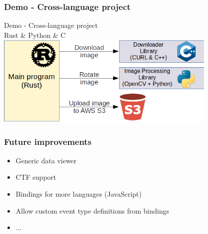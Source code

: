 \documentclass{beamer}
\begin{document}
\begin{frame}
  \frametitle{Demo - Cross-language project}
  \begin{center}
    \Huge Demo - Cross-language project
    \vspace{0.2em} \\
    \large Rust \& Python \& C
    \vspace{1em} \\
    \includegraphics[width=0.8\textwidth]{img/rotate-diagram.png} \\
  \end{center}
\end{frame}

\begin{frame}
  \frametitle{Future improvements}
  \begin{itemize}
    \item Generic data viewer
    \item CTF support
    \item Bindings for more languages (JavaScript)
    \item Allow custom event type definitions from bindings
    \item ...
  \end{itemize}
\end{frame}
\end{document}
